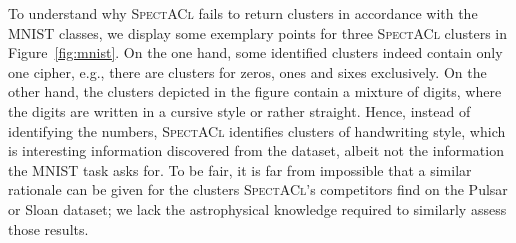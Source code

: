 To understand why \textsc{SpectACl} fails to return clusters in accordance with the MNIST classes, we display some exemplary points for three \textsc{SpectACl} clusters in Figure~\ref{fig:mnist}. On the one hand, some identified clusters indeed contain only one cipher, e.g., there are clusters for zeros, ones and sixes exclusively. On the other hand, the clusters depicted in the figure contain a mixture of digits, where the digits are written in a cursive style or rather straight. Hence, instead of identifying the numbers, \textsc{SpectACl} identifies clusters of handwriting style, which is interesting information discovered from the dataset, albeit not the information the MNIST task asks for. To be fair, it is far from impossible that a similar rationale can be given for the clusters \textsc{SpectACl}'s competitors find on the Pulsar or Sloan dataset; we lack the astrophysical knowledge required to similarly assess those results.

